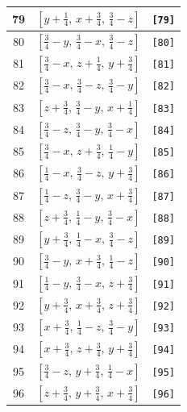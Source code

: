 \documentclass[fleqn,8pt]{jsarticle}
\begin{document}
\begin{longtable}{ccc}
79 & $\left[ y + \frac{1}{4},\, x + \frac{3}{4},\, \frac{3}{4} - z \right]$ & {\tt [79]} \\ \hline
80 & $\left[ \frac{3}{4} - y,\, \frac{3}{4} - x,\, \frac{3}{4} - z \right]$ & {\tt [80]} \\ \hline
81 & $\left[ \frac{3}{4} - x,\, z + \frac{1}{4},\, y + \frac{3}{4} \right]$ & {\tt [81]} \\ \hline
82 & $\left[ \frac{3}{4} - x,\, \frac{3}{4} - z,\, \frac{3}{4} - y \right]$ & {\tt [82]} \\ \hline
83 & $\left[ z + \frac{3}{4},\, \frac{3}{4} - y,\, x + \frac{1}{4} \right]$ & {\tt [83]} \\ \hline
84 & $\left[ \frac{3}{4} - z,\, \frac{3}{4} - y,\, \frac{3}{4} - x \right]$ & {\tt [84]} \\ \hline
85 & $\left[ \frac{3}{4} - x,\, z + \frac{3}{4},\, \frac{1}{4} - y \right]$ & {\tt [85]} \\ \hline
86 & $\left[ \frac{1}{4} - x,\, \frac{3}{4} - z,\, y + \frac{3}{4} \right]$ & {\tt [86]} \\ \hline
87 & $\left[ \frac{1}{4} - z,\, \frac{3}{4} - y,\, x + \frac{3}{4} \right]$ & {\tt [87]} \\ \hline
88 & $\left[ z + \frac{3}{4},\, \frac{1}{4} - y,\, \frac{3}{4} - x \right]$ & {\tt [88]} \\ \hline
89 & $\left[ y + \frac{3}{4},\, \frac{1}{4} - x,\, \frac{3}{4} - z \right]$ & {\tt [89]} \\ \hline
90 & $\left[ \frac{3}{4} - y,\, x + \frac{3}{4},\, \frac{1}{4} - z \right]$ & {\tt [90]} \\ \hline
91 & $\left[ \frac{1}{4} - y,\, \frac{3}{4} - x,\, z + \frac{3}{4} \right]$ & {\tt [91]} \\ \hline
92 & $\left[ y + \frac{3}{4},\, x + \frac{3}{4},\, z + \frac{3}{4} \right]$ & {\tt [92]} \\ \hline
93 & $\left[ x + \frac{3}{4},\, \frac{1}{4} - z,\, \frac{3}{4} - y \right]$ & {\tt [93]} \\ \hline
94 & $\left[ x + \frac{3}{4},\, z + \frac{3}{4},\, y + \frac{3}{4} \right]$ & {\tt [94]} \\ \hline
95 & $\left[ \frac{3}{4} - z,\, y + \frac{3}{4},\, \frac{1}{4} - x \right]$ & {\tt [95]} \\ \hline
96 & $\left[ z + \frac{3}{4},\, y + \frac{3}{4},\, x + \frac{3}{4} \right]$ & {\tt [96]} \\
\end{longtable}
\end{document}
